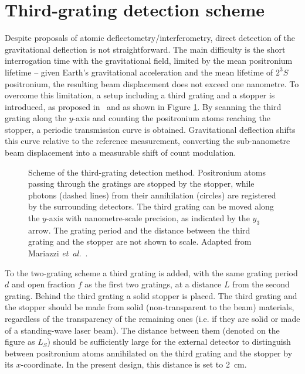 \documentclass[12pt]{report}
\begin{document}
\section{Third-grating detection scheme}\label{sec:third}

Despite proposals of atomic deflectometry/interferometry, direct detection of the gravitational deflection is not straightforward. The main difficulty is the short interrogation time with the gravitational field, limited by the mean positronium lifetime -- given Earth's gravitational acceleration and the mean lifetime of \(2^3S\) positronium, the resulting beam displacement does not exceed one nanometre. To overcome this limitation, a setup including a third grating and a stopper is introduced, as proposed in~\cite{Mariazzi_Caravita_Doser_Nebbia_Brusa_2020} and as shown in Figure \ref{fig:third}. By scanning the third grating along the \(y\)-axis and counting the positronium atoms reaching the stopper, a periodic transmission curve is obtained. Gravitational deflection shifts this curve relative to the reference measurement, converting the sub-nanometre beam displacement into a measurable shift of count modulation.

\begin{figure}[ht!]
    \centering
    \resizebox{0.95\textwidth}{!}{}
    \caption[Third-grating detection scheme]{Scheme of the third-grating detection method. Positronium atoms passing through the gratings are stopped by the stopper, while photons (dashed lines) from their annihilation (circles) are registered by the surrounding detectors. The third grating can be moved along the $y$-axis with nanometre-scale precision, as indicated by the $y_3$ arrow. The grating period and the distance between the third grating and the stopper are not shown to scale. Adapted from Mariazzi \emph{et~al.}~\cite{Mariazzi_Caravita_Doser_Nebbia_Brusa_2020}.}
    \label{fig:third}
    
\end{figure}

To the two-grating scheme a third grating is added, with the same grating period \(d\) and open fraction \(f\) as the first two gratings, at a distance \(L\) from the second grating. Behind the third grating a solid stopper is placed. The third grating and the stopper should be made from solid (non-transparent to the beam) materials, regardless of the transparency of the remaining ones (i.e. if they are solid or made of a standing-wave laser beam). The distance between them (denoted on the figure as \(L_S\)) should be sufficiently large for the external detector to distinguish between positronium atoms annihilated on the third grating and the stopper by its \(x\)-coordinate. In the present design, this distance is set to 2~cm. 
\end{document}

